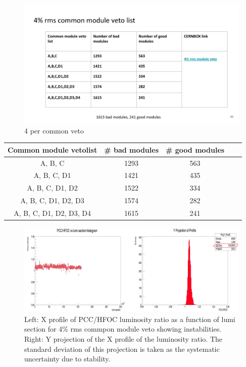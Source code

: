 \begin{figure}[!htp]
\centering
\includegraphics[width=1\textwidth]{ashish_thesis/4per_rms_common_veto.png}
\caption{%
   4 per common veto
}
\label{fig:4per common veto}
\end{figure}


\begin{table}[!ht]
\centering
{}
\begin{tabular}{ccccc}
    \textbf{Common module vetolist} & \textbf{# bad modules} & \textbf{# good modules} \\ \hline
    A, B, C & 1293 & 563  \\
    A, B, C, D1 & 1421  & 435  \\
    A, B, C, D1, D2 & 1522  & 334 \\
    A, B, C, D1, D2, D3 & 1574  & 282  \\
   A, B, C, D1, D2, D3, D4  & 1615  & 241 \\
\end{tabular}
\label{tab:pccvis_diffveto}
\end{table}






\begin{figure}[!htp]
\centering
\includegraphics[width=1\textwidth]{ashish_thesis/pcc_hfoc_ratio_stability_4per_common_veto.png}
\caption{%
   Left: X profile of PCC/HFOC luminosity ratio as a function of lumi section for 4\% rms commpon module veto showing instabilities.  Right: Y projection of the X profile of the luminosity ratio. The standard deviation of this projection is taken as the systematic uncertainty due to stability.
}
\label{fig:4per common veto sys}
\end{figure}



